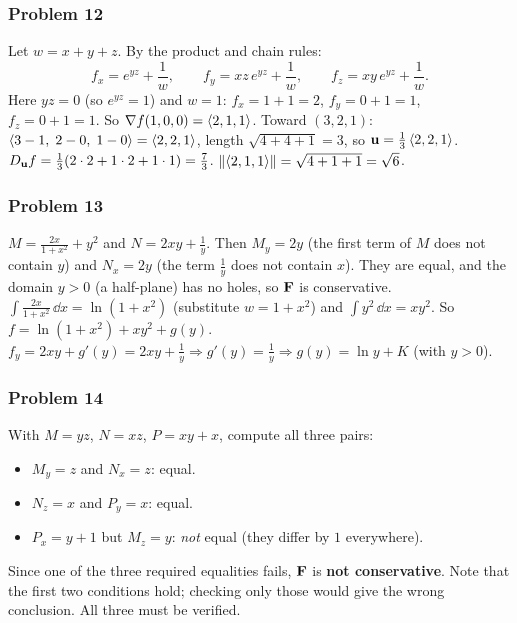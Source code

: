 
\subsubsection*{Problem 12}

 Let $w=x+y+z$. By the product and chain rules:
\[
  f_x=e^{yz}+\frac1w,\qquad f_y=xz\,e^{yz}+\frac1w,\qquad f_z=xy\,e^{yz}+\frac1w .
\]
 Here $yz=0$ (so $e^{yz}=1$) and $w=1$:
$f_x=1+1=2$, $f_y=0+1=1$, $f_z=0+1=1$. So $\nabla f(1,0,0)=\left\langle 2,1,1 \right\rangle$.
 Toward $(3,2,1)$: $\left\langle 3-1,\;2-0,\;1-0 \right\rangle=\left\langle 2,2,1 \right\rangle$, length $\sqrt{4+4+1}=3$,
so $\mathbf{u}=\frac13\left\langle 2,2,1 \right\rangle$.
 $D_{\mathbf{u}} f=\frac13(2\cdot2+1\cdot2+1\cdot1)=\frac73$.
 $\lVert\left\langle 2,1,1 \right\rangle\rVert=\sqrt{4+1+1}=\sqrt6$.


\subsubsection*{Problem 13}

 $M=\frac{2x}{1+x^2}+y^2$ and $N=2xy+\frac1y$. Then $M_y=2y$ (the first term of $M$
does not contain $y$) and $N_x=2y$ (the term $\frac1y$ does not contain $x$). They are equal, and
the domain $y>0$ (a half-plane) has no holes, so $\mathbf{F}$ is conservative.
 $\int\frac{2x}{1+x^2}\,\dd x=\ln(1+x^2)$ (substitute $w=1+x^2$) and
$\int y^2\,\dd x=xy^2$. So $f=\ln(1+x^2)+xy^2+g(y)$.
 $f_y=2xy+g'(y)=2xy+\frac1y\Rightarrow g'(y)=\frac1y\Rightarrow g(y)=\ln y+K$ (with $y>0$).


\subsubsection*{Problem 14}

With $M=yz$, $N=xz$, $P=xy+x$, compute all three pairs:
\begin{itemize}
\item $M_y=z$ and $N_x=z$: equal.
\item $N_z=x$ and $P_y=x$: equal.
\item $P_x=y+1$ but $M_z=y$: \emph{not} equal (they differ by $1$ everywhere).
\end{itemize}
Since one of the three required equalities fails, $\mathbf{F}$ is \textbf{not conservative}.
Note that the first two conditions hold; checking only those would give the wrong
conclusion. All three must be verified.

